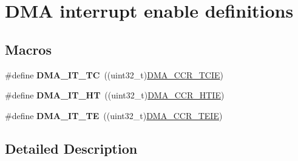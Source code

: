 \hypertarget{group___d_m_a__interrupt__enable__definitions}{}\section{D\+MA interrupt enable definitions}
\label{group___d_m_a__interrupt__enable__definitions}
\subsection*{Macros}
\begin{DoxyCompactItemize}
\item 
\mbox{\label{group___d_m_a__interrupt__enable__definitions_ga06e83dd277e0d3e5635cf8ce8dfd6e16}} 
\#define {\bfseries D\+M\+A\+\_\+\+I\+T\+\_\+\+TC}~((uint32\+\_\+t)\hyperlink{group___peripheral___registers___bits___definition_gaaba9cd82cab0cca23de038e946f81c6a}{D\+M\+A\+\_\+\+C\+C\+R\+\_\+\+T\+C\+IE})
\item 
\mbox{\label{group___d_m_a__interrupt__enable__definitions_gadf11c572b9797e04a14b105fdc2e5f66}} 
\#define {\bfseries D\+M\+A\+\_\+\+I\+T\+\_\+\+HT}~((uint32\+\_\+t)\hyperlink{group___peripheral___registers___bits___definition_ga0f0fae31377ab1d33e36cead97b1811b}{D\+M\+A\+\_\+\+C\+C\+R\+\_\+\+H\+T\+IE})
\item 
\mbox{\label{group___d_m_a__interrupt__enable__definitions_gaf9d92649d2a0146f663ff253d8f3b59e}} 
\#define {\bfseries D\+M\+A\+\_\+\+I\+T\+\_\+\+TE}~((uint32\+\_\+t)\hyperlink{group___peripheral___registers___bits___definition_ga3dd2204c9046500140e3c720fb5a415f}{D\+M\+A\+\_\+\+C\+C\+R\+\_\+\+T\+E\+IE})
\end{DoxyCompactItemize}


\subsection{Detailed Description}
